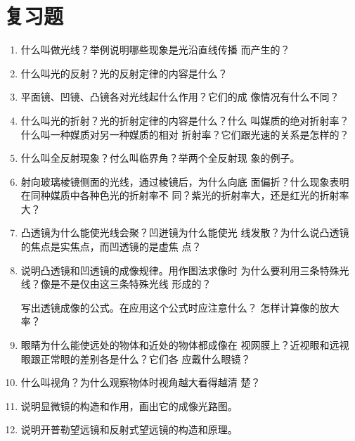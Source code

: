 \section*{复习题}
\begin{enumerate}
\item 什么叫做光线？举例说明哪些现象是光沿直线传播
而产生的？
\item 什么叫光的反射？光的反射定律的内容是什么？
\item 平面镜、凹镜、凸镜各对光线起什么作用？它们的成
像情况有什么不同？
\item 什么叫光的折射？光的折射定律的内容是什么？什么
叫媒质的绝对折射率？什么叫一种媒质对另一种媒质的相对
折射率？它们跟光速的关系是怎样的？
\item 什么叫全反射現象？付么叫临界角？举两个全反射现
象的例子。
\item 射向玻璃棱镜侧面的光线，通过棱镜后，为什么向底
面偏折？什么现象表明在同种媒质中各种色光的折射率不
同？紫光的折射率大，还是红光的折射率大？
\item 凸透镜为什么能使光线会聚？凹迸镜为什么能使光
线发散？为什么说凸透镜的焦点是实焦点，而凹透镜的是虚焦
点？
\item 说明凸透镜和凹透镜的成像规律。用作图法求像时
为什么要利用三条特殊光线？像是不是仅由这三条特殊光线
形成的？

写出透镜成像的公式。在应用这个公式时应注意什么？
怎样计算像的放大率？
\item 眼睛为什么能使远处的物体和近处的物体都成像在
视网膜上？近视眼和远视眼跟正常眼的差别各是什么？它们各
应戴什么眼镜？
\item 什么叫视角？为什么观察物体时视角越大看得越清
楚？
\item 说明显微镜的构造和作用，画出它的成像光路图。
\item 说明开普勒望远镜和反射式望远镜的构造和原理。

\end{enumerate}

